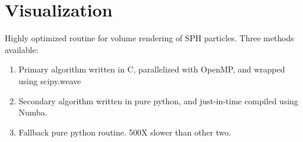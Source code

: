 \section{Visualization}
\label{sec:vis}

Highly optimized routine for volume rendering of SPH particles.  Three methods available:
\begin{enumerate}
\item Primary algorithm written in C, parallelized with OpenMP, and wrapped using scipy.weave
\item Secondary algorithm written in pure python, and just-in-time compiled using Numba.
\item Fallback pure python routine.  500X slower than other two.
\end{enumerate}